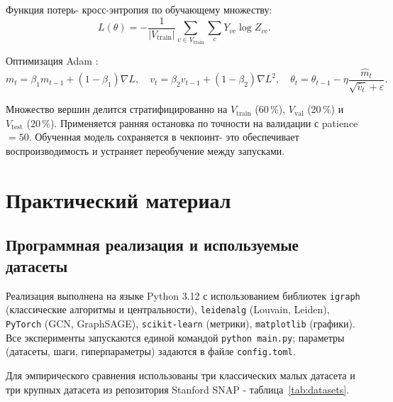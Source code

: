 \documentclass[14pt,a4paper]{extarticle}
\begin{document}
Функция потерь- кросс-энтропия по обучающему множеству:
\begin{equation}
L(\theta) = -\frac{1}{|V_{\mathrm{train}}|} \sum_{v \in V_{\mathrm{train}}} \sum_c Y_{vc} \log Z_{vc}.
\end{equation}

Оптимизация Adam \cite{kingma2015}:
\begin{equation}
m_t = \beta_1 m_{t-1} + (1 - \beta_1) \nabla L, \quad v_t = \beta_2 v_{t-1} + (1 - \beta_2) \nabla L^2, \quad \theta_t = \theta_{t-1} - \eta \frac{\hat m_t}{\sqrt{\hat v_t} + \varepsilon}.
\end{equation}

Множество вершин делится стратифицированно на $V_{\mathrm{train}}$ (60\,\%), $V_{\mathrm{val}}$ (20\,\%) и $V_{\mathrm{test}}$ (20\,\%). Применяется ранняя остановка по точности на валидации с patience $= 50$. Обученная модель сохраняется в чекпоинт- это обеспечивает воспроизводимость и устраняет переобучение между запусками.

\section{Практический материал}

\subsection{Программная реализация и используемые датасеты}

Реализация выполнена на языке Python 3.12 с использованием библиотек \texttt{igraph} (классические алгоритмы и центральности), \texttt{leidenalg} (Louvain, Leiden), \texttt{PyTorch} (GCN, GraphSAGE), \texttt{scikit-learn} (метрики), \texttt{matplotlib} (графики). Все эксперименты запускаются единой командой \texttt{python main.py}; параметры (датасеты, шаги, гиперпараметры) задаются в файле \texttt{config.toml}.

Для эмпирического сравнения использованы три классических малых датасета \cite{zachary1977,girvan2002} и три крупных датасета из репозитория Stanford SNAP \cite{snap}- таблица~\ref{tab:datasets}.
\end{document}
